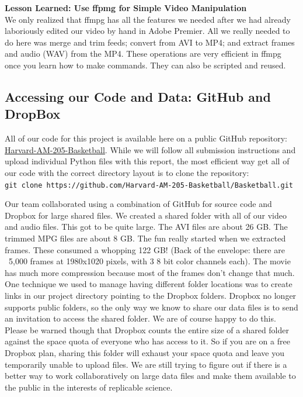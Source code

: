 \documentclass{article}
\begin{document}
\textbf{Lesson Learned: Use ffpmg for Simple Video Manipulation}\\
We only realized that ffmpg has all the features we needed after we had already laboriously
edited our video by hand in Adobe Premier.  
All we really needed to do here was merge and trim feeds; convert from AVI to MP4;
and extract frames and audio (WAV) from the MP4.
These operations are very efficient in ffmpg once you learn how to make commands.
They can also be scripted and reused.

\subsection{Accessing our Code and Data: GitHub and DropBox}
All of our code for this project is available here on a public GitHub repository:\\
\href{https://github.com/Harvard-AM-205-Basketball/Basketball}{Harvard-AM-205-Basketball}.
While we will follow all submission instructions and upload individual Python files with this report,
the most efficient way get all of our code with the correct directory layout is to clone the repository: \\
\texttt{git clone https://github.com/Harvard-AM-205-Basketball/Basketball.git}

Our team collaborated using a combination of GitHub for source code and Dropbox for large shared files.
We created a shared folder with all of our video and audio files.  This got to be quite large.
The AVI files are about 26 GB.  The trimmed MPG files are about 8 GB.  
The fun really started when we extracted frames.  These consumed a whopping 122 GB!
(Back of the envelope: there are ~5,000 frames at 1980x1020 pixels, with 3 8 bit color channels each).
The movie has much more compression because most of the frames don't change that much.
One technique we used to manage having different folder locations was to create links in our
project directory pointing to the Dropbox folders.  
Dropbox no longer supports public folders, so the only way we know to share our data files
is to send an invitation to access the shared folder.  We are of course happy to do this.
Please be warned though that Dropbox counts the entire size of a shared folder against the
space quota of everyone who has access to it.  So if you are on a free Dropbox plan, 
sharing this folder will exhaust your space quota and leave you temporarily unable to upload files.
We are still trying to figure out if there is a better way to work collaboratively on large data files
and make them available to the public in the interests of replicable science.
\end{document}
